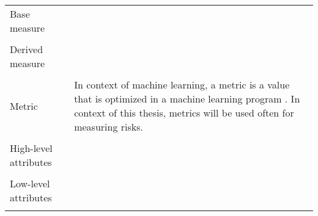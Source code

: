 \begin{center}
  \begin{tabular}{ |L{4cm}|L{10cm}|  }
    \hline
    Base measure & \\
    & \\
    \hline
    Derived measure & \\
    & \\
    \hline
    Metric & In context of machine learning, a metric is a value that is
    optimized  in a machine learning program \cite{google}.
    In context of this thesis, metrics will be used often for
    measuring risks. \\
    & \\
    \hline
    High-level attributes & \\
    & \\
    \hline
    Low-level attributes & \\
    & \\
    \hline
  \end{tabular}
\end{center}
